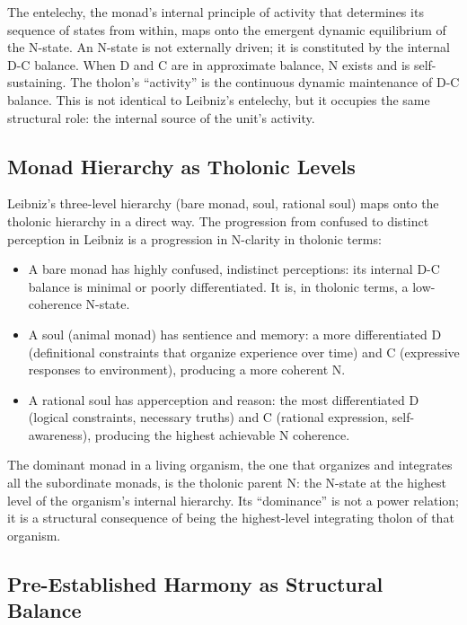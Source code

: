 \documentclass[12pt]{article}
\providecommand{\tightlist}{%
  \setlength{\itemsep}{0pt}\setlength{\parskip}{0pt}}
\begin{document}
The entelechy, the monad's internal principle of activity that
determines its sequence of states from within, maps onto the emergent
dynamic equilibrium of the N-state. An N-state is not externally driven;
it is constituted by the internal D-C balance. When D and C are in
approximate balance, N exists and is self-sustaining. The tholon's
``activity'' is the continuous dynamic maintenance of D-C balance. This
is not identical to Leibniz's entelechy, but it occupies the same
structural role: the internal source of the unit's activity.

\subsection{Monad Hierarchy as Tholonic Levels}\label{monad-hierarchy-as-tholonic-levels}

Leibniz's three-level hierarchy (bare monad, soul, rational soul) maps
onto the tholonic hierarchy in a direct way. The progression from
confused to distinct perception in Leibniz is a progression in N-clarity
in tholonic terms:

\begin{itemize}
\tightlist
\item
  A bare monad has highly confused, indistinct perceptions: its internal
  D-C balance is minimal or poorly differentiated. It is, in tholonic
  terms, a low-coherence N-state.
\item
  A soul (animal monad) has sentience and memory: a more differentiated
  D (definitional constraints that organize experience over time) and C
  (expressive responses to environment), producing a more coherent N.
\item
  A rational soul has apperception and reason: the most differentiated D
  (logical constraints, necessary truths) and C (rational expression,
  self-awareness), producing the highest achievable N coherence.
\end{itemize}

The dominant monad in a living organism, the one that organizes and
integrates all the subordinate monads, is the tholonic parent N: the
N-state at the highest level of the organism's internal hierarchy. Its
``dominance'' is not a power relation; it is a structural consequence of
being the highest-level integrating tholon of that organism.

\subsection{Pre-Established Harmony as Structural Balance}\label{pre-established-harmony-as-structural-balance}
\end{document}
